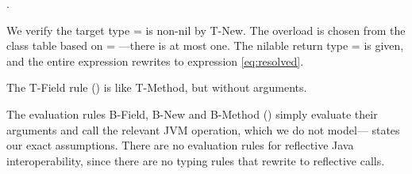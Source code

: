 {\methodexp {\getparent{}} {\newstaticexp {\String} {\File{}} {\File{}} {}} {}}.

We verify the target type \s{} = \File is non-nil by T-New.
The overload is chosen from the class table based on  = \File---there is at most one.
The nilable return type \ty{} = \Union{\Nil}{\String} is given, and the 
entire expression rewrites to expression \ref{eq:resolved}.
%

The T-Field rule () is like T-Method, but without arguments.

The evaluation rules B-Field, B-New and B-Method () simply evaluate their
arguments and call the relevant JVM operation, which we do not model---
states our exact assumptions.
There are no evaluation rules for reflective Java interoperability, since there are no typing
rules that rewrite to reflective calls.


